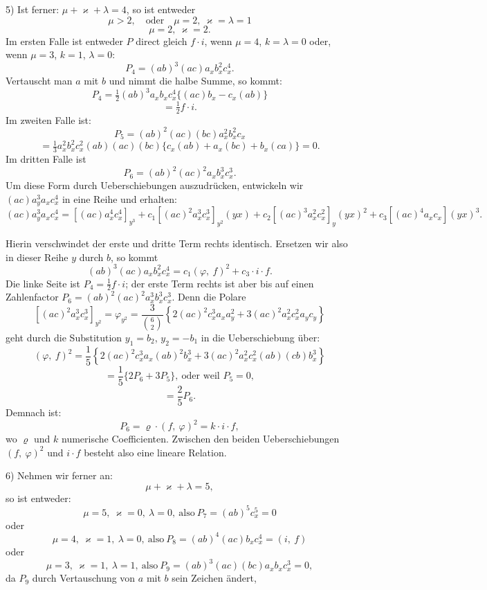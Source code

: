 \documentclass[11pt]{article}
\providecommand{\weberpage}[1]{}
\begin{document}
5) Ist ferner: $\mu + \varkappa + \lambda = 4$, so ist entweder
\[
\mu > 2,\quad \text{oder}\quad \mu = 2,\ \varkappa = \lambda = 1
\]
\[
\mu = 2,\ \varkappa = 2.
\]
Im ersten Falle ist entweder $P$ direct gleich $f \cdot i$, wenn $\mu = 4$, $k = \lambda = 0$ %
oder, wenn $\mu = 3$, $k = 1$, $\lambda = 0$: %
\[
P_4 = (ab)^3 (ac) a_x b_x^2 c_x^4.
\]
Vertauscht man $a$ mit $b$ und nimmt die halbe Summe, so kommt:
\[
P_4 = \tfrac{1}{2} (ab)^3 a_x b_x c_x^4 \{(ac) b_x - c_x (ab)\}
\]
\[
= \tfrac{1}{2} f \cdot i.
\]
Im zweiten Falle ist:
\[
P_5 = (ab)^2 (ac) (bc) a_x^2 b_x^2 c_x
\]
\[
= \tfrac{1}{3} a_x^2 b_x^2 c_x^2 (ab)(ac)(bc) \{c_x (ab) + a_x (bc) + b_x (ca)\} = 0.
\]
Im dritten Falle ist
\[
P_6 = (ab)^2 (ac)^2 a_x b_x^3 c_x^3.
\]
Um diese Form durch Ueberschiebungen auszudrücken, entwickeln wir $(ac) a_y^3 a_x c_x^4$ in eine Reihe und erhalten:
\[
(ac) a_y^3 a_x c_x^4 = [(ac) a_x^4 c_x^4]_{y^3} + c_1 [(ac)^2 a_x^3 c_x^3]_{y^2} (yx) + c_2 [(ac)^3 a_x^2 c_x^2]_y (yx)^2 + c_3 [(ac)^4 a_x c_x] (yx)^3.
\]


\weberpage{96}
Hierin verschwindet der erste und dritte Term rechts identisch. Ersetzen wir also in dieser Reihe $y$ durch $b$, so kommt
\[
(ab)^3 (ac) a_x b_x^2 c_x^4 = c_1 (\varphi,\ f)^2 + c_3 \cdot i \cdot f.
\]
Die linke Seite ist $P_4 = \tfrac{1}{2} f \cdot i$; der erste Term rechts ist aber bis auf einen Zahlenfactor $P_6 = (ab)^2 (ac)^2 a_x^3 b_x^3 c_x^3$. Denn die Polare
\[
[(ac)^2 a_x^3 c_x^3]_{y^2} = \varphi_{y^2} = \frac{3}{\binom{6}{2}} \left\{ 2 (ac)^2 c_x^3 a_x a_y^2 + 3 (ac)^2 a_x^2 c_x^2 a_y c_y \right\}
\]
geht durch die Substitution $y_1 = b_2$, $y_2 = -b_1$ in die Ueberschiebung über:
\[
(\varphi,\ f)^2 = \frac{1}{5} \left\{ 2 (ac)^2 c_x^3 a_x (ab)^2 b_x^3 + 3 (ac)^2 a_x^2 c_x^2 (ab)(cb) b_x^3 \right\}
\]
\[
= \frac{1}{5} \{ 2 P_6 + 3 P_5 \},\ \text{oder weil } P_5 = 0,
\]
\[
= \frac{2}{5} P_6.
\]
Demnach ist:
\[
P_6 = \varrho \cdot (f,\ \varphi)^2 = k \cdot i \cdot f,
\]
wo $\varrho$ und $k$ numerische Coefficienten. Zwischen den beiden Ueberschiebungen $(f,\ \varphi)^2$ und $i \cdot f$ besteht also eine lineare Relation.

6) Nehmen wir ferner an:
\[
\mu + \varkappa + \lambda = 5,
\]
so ist entweder:
\[
\mu = 5,\ \varkappa = 0,\ \lambda = 0,\ \text{also}\ P_7 = (ab)^5 c_x^5 = 0
\]
oder
\[
\mu = 4,\ \varkappa = 1,\ \lambda = 0,\ \text{also}\ P_8 = (ab)^4 (ac) b_x c_x^4 = (i,\ f)
\]
oder
\[
\mu = 3,\ \varkappa = 1,\ \lambda = 1,\ \text{also}\ P_9 = (ab)^3 (ac) (bc) a_x b_x c_x^3 = 0,
\]
da $P_9$ durch Vertauschung von $a$ mit $b$ sein Zeichen ändert,
\end{document}
